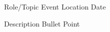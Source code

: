 

\begin{cventries}

  \cventry
    {Role/Topic} %
    {Event} %
    {Location} %
    {Date} %
    {
      \begin{cvitems} %
        \item {Description Bullet Point}
      \end{cvitems}
    }


\end{cventries}
